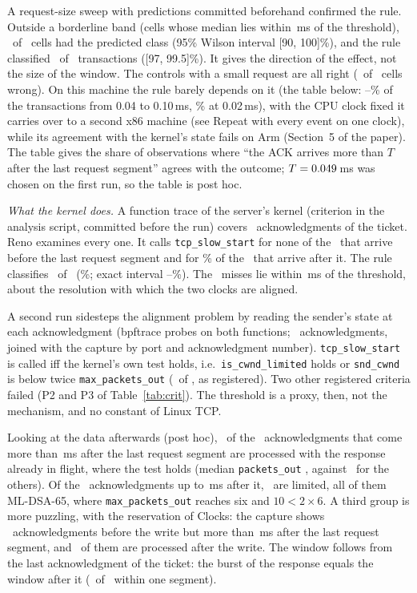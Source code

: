 \documentclass[9pt]{article}
\newcommand{\ms}{\,ms\xspace}
\begin{document}
A request-size sweep with predictions committed beforehand confirmed the rule. Outside a borderline band (cells whose median lies within \RaceBand\ms of the threshold), \RaceTwoRight\ of \RaceTwoScored\ cells had the predicted class (95\% Wilson interval [90, 100]\%), and the rule classified \RaceTwoOosRight\ of \RaceTwoOosN\ transactions ([97, 99.5]\%). It gives the direction of the effect, not the size of the window. The controls with a small request are all right (\ECtlWrong\ of \ECtlN\ cells wrong). On this machine the rule barely depends on it (the table below: \ThrSLoR--\ThrSHiR\% of the transactions from 0.04 to 0.10\ms, \ThrSA\% at 0.02\ms), with the CPU clock fixed it carries over to a second x86 machine (see Repeat with every event on one clock), while its agreement with the kernel's state fails on Arm (Section~5 of the paper). The table gives the share of observations where ``the ACK arrives more than $T$ after the last request segment'' agrees with the outcome; $T=0.049$\ms was chosen on the first run, so the table is post hoc.

\emph{What the kernel does.} A function trace of the server's kernel (criterion in the analysis script, committed before the run) covers \KerN\ acknowledgments of the ticket. Reno examines every one. It calls \texttt{tcp\_slow\_start} for none of the \KerBeforeN\ that arrive before the last request segment and for \KerAfterSS\% of the \KerAfterN\ that arrive after it. The rule classifies \KerRight\ of \KerN\ (\KerPct\%; exact interval \CiKerLo--\CiKerHi\%). The \KerWrong\ misses lie within \KerMissNear\ms of the threshold, about the resolution with which the two clocks are aligned.

A second run sidesteps the alignment problem by reading the sender's state at each acknowledgment (bpftrace probes on both functions; \StN\ acknowledgments, joined with the capture by port and acknowledgment number). \texttt{tcp\_\allowbreak slow\_\allowbreak start} is called iff the kernel's own test holds, i.e.\ \texttt{is\_\allowbreak cwnd\_\allowbreak limited} holds or \texttt{snd\_\allowbreak cwnd} is below twice \texttt{max\_\allowbreak packets\_\allowbreak out} (\StPOneRight\ of \StPOneN, as registered). Two other registered criteria failed (P2 and P3 of Table~\ref{tab:crit}). The threshold is a proxy, then, not the mechanism, and no constant of Linux TCP.

Looking at the data afterwards (post hoc), \StLateInflight\ of the \StLate\ acknowledgments that come more than \RaceThr\ms after the last request segment are processed with the response already in flight, where the test holds (median \texttt{packets\_out} \StAfterPk, against \StBeforePk\ for the others). Of the \StEarly\ acknowledgments up to \RaceThr\ms after it, \StEarlyLimited\ are limited, all of them ML-DSA-65, where \texttt{max\_packets\_out} reaches six and $10<2\times6$. A third group is more puzzling, with the reservation of Clocks: the capture shows \StDeferredN\ acknowledgments before the write but more than \RaceThr\ms after the last request segment, and \StDeferred\ of them are processed after the write. The window follows from the last acknowledgment of the ticket: the burst of the response equals the window after it (\StPTwoBRight\ of \StPTwoBN\ within one segment).
\end{document}
